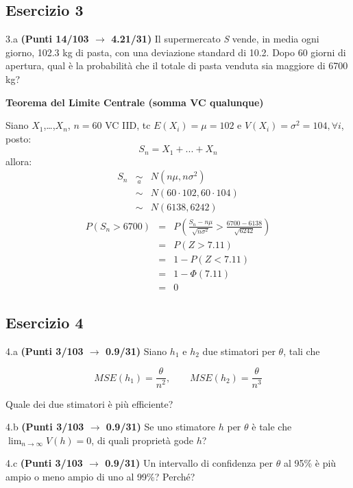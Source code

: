 \documentclass[
  11pt,
]{book}
\theoremstyle{mytheoremstyle}
\theoremstyle{mydefstyle}
\begin{document}
\subsection{Esercizio 3}\label{esercizio-3-15}

3.a \textbf{(Punti 14/103 \(\rightarrow\) 4.21/31)} Il supermercato \emph{S} vende, in media ogni giorno, 102.3 kg di pasta, con una deviazione standard di 10.2. Dopo 60 giorni di apertura, qual è la probabilità che il totale di pasta venduta sia maggiore di 6700 kg?

\textbf{Teorema del Limite Centrale (somma VC qualunque)}

Siano \(X_1\),\ldots,\(X_n\), \(n=60\) VC IID, tc \(E(X_i)=\mu=102\) e \(V(X_i)=\sigma^2=104,\forall i\), posto:
\[
      S_n = X_1 + ... + X_n
      \]
allora:\begin{eqnarray*}
  S_n & \mathop{\sim}\limits_{a}& N(n\mu,n\sigma^2) \\
     &\sim & N(60\cdot102,60\cdot104) \\
     &\sim & N(6138,6242) 
  \end{eqnarray*}\begin{eqnarray*}
      P( S_n   >   6700 ) 
        &=& P\left(  \frac { S_n  -  n\mu }{ \sqrt{n\sigma^2} }  >  \frac { 6700  -  6138 }{\sqrt{ 6242 }} \right)  \\
                 &=& P\left(  Z   >   7.11 \right) \\    &=& 1-P(Z< 7.11 )\\ 
                 &=&  1-\Phi( 7.11 ) \\ &=&  0 
      \end{eqnarray*}

\subsection{Esercizio 4}\label{esercizio-4-15}

4.a \textbf{(Punti 3/103 \(\rightarrow\) 0.9/31)} Siano \(h_1\) e \(h_2\) due stimatori per \(\theta\), tali che

\[
MSE(h_1) =  \frac{\theta}{n^2}, \qquad MSE(h_2) =  \frac{\theta}{n^3}
\]

Quale dei due stimatori è più efficiente?

4.b \textbf{(Punti 3/103 \(\rightarrow\) 0.9/31)} Se uno stimatore \(h\) per \(\theta\) è tale che \(\lim_{n\to\infty}V(h)=0\), di quali proprietà gode \(h\)?

4.c \textbf{(Punti 3/103 \(\rightarrow\) 0.9/31)} Un intervallo di confidenza per \(\theta\) al 95\% è più ampio o meno ampio di uno al 99\%? Perché?
\end{document}

